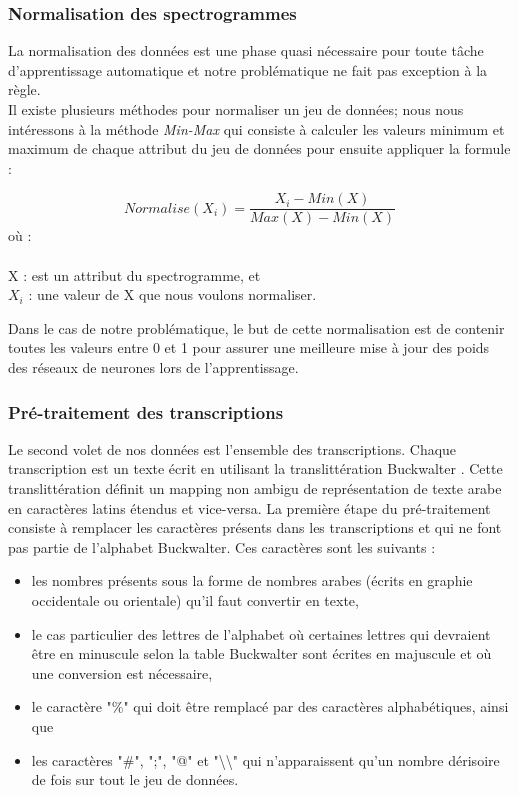 \subsubsection{Normalisation des spectrogrammes}\label{normalisation_section}
La normalisation des données est une phase quasi nécessaire pour toute tâche d'apprentissage automatique et notre problématique ne fait pas exception à la règle.\\
Il existe plusieurs méthodes pour normaliser un jeu de données; nous nous intéressons à la méthode \textit{Min-Max} qui consiste à calculer les valeurs minimum et maximum de chaque attribut du jeu de données pour ensuite appliquer la formule : 

    \begin{equation}
            Normalise(X_{i}) = \frac{X_{i} - Min(X)}{Max(X) - Min(X)}
            \label{normalisation_equation}
    \end{equation}
    où :\\ \\
    X : est un attribut du spectrogramme, et \\
    $X_{i}$ : une valeur de X que nous voulons normaliser.

Dans le cas de notre problématique, le but de cette normalisation est de contenir toutes les valeurs entre 0 et 1 pour assurer une meilleure mise à jour des poids des réseaux de neurones lors de l'apprentissage.

\subsubsection{Pré-traitement des transcriptions}\label{trans_preprocessing}

Le second volet de nos données est l'ensemble des transcriptions. Chaque transcription est un texte écrit en utilisant la translittération Buckwalter \cite{buckwalter}. Cette translittération définit un mapping non ambigu de représentation de texte arabe en caractères latins étendus et vice-versa. La première étape du pré-traitement consiste à remplacer les caractères présents dans les transcriptions et qui ne font pas partie de l'alphabet Buckwalter. Ces caractères sont les suivants : 
\begin{itemize}
    \item les nombres présents sous la forme de nombres arabes (écrits en graphie occidentale ou orientale) qu'il faut convertir en texte,
    \item le cas particulier des lettres de l'alphabet où certaines lettres qui devraient être en minuscule selon la table Buckwalter sont écrites en majuscule et où une conversion est nécessaire,
    \item le caractère "\%" qui doit être remplacé par des caractères alphabétiques, ainsi que
    \item les caractères "\#", ";", "@" et "\textbackslash \textbackslash" qui n'apparaissent qu'un nombre dérisoire de fois sur tout le jeu de données.\\
\end{itemize}

